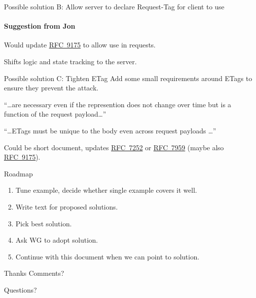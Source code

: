 \documentclass[aspectratio=169,colorlinks]{beamer}
\newcommand{\rfc}[1]{\href{https://datatracker.ietf.org/doc/html/rfc#1}{RFC~#1}}
\begin{document}
\begin{frame}{Possible solution B: Allow server to declare Request-Tag for client to use}\large
	\framesubtitle{Suggestion from Jon}

	Would update \rfc{9175} to allow use in requests.

	Shifts logic and state tracking to the server.
\end{frame}

\begin{frame}{Possible solution C: Tighten ETag}\large
	Add some small requirements around ETags
	to ensure they prevent the attack.

	\bigskip

	``\ldots are necessary even if the represention does not change over time but is a function of the request payload\ldots''

	``\ldots ETags must be unique to the body even across request payloads \ldots''

	\bigskip

	Could be short document, updates \rfc{7252} or \rfc{7959} (maybe also \rfc{9175}).
\end{frame}

\begin{frame}{Roadmap}\Large
	\begin{enumerate}
		\item Tune example, decide whether single example covers it well.
		\item Write text for proposed solutions.
		\item Pick best solution.
		\item Ask WG to adopt solution.
		\item Continue with this document when we can point to solution.
	\end{enumerate}
\end{frame}

\begin{frame}{Thanks}\Large
	Comments?

	\bigskip

	Questions?
\end{frame}
\end{document}
